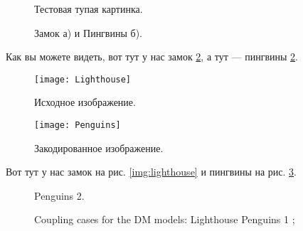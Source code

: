 \documentclass[a4paper,12pt]{report} %
\begin{document}
    \begin{spacing}{0.9}
        \tableofcontents %
    \end{spacing}
    \begin{figure}[h]
        \caption{Тестовая тупая картинка.}
        \label{img:image}
    \end{figure}
    \begin{figure}[h]
        \begin{minipage}[h]{0.49\linewidth}
        \end{minipage}
        \hfill
        \begin{minipage}[h]{0.49\linewidth}
        \end{minipage}
        \caption{Замок а) и Пингвины б).}
        \label{img:castle_penguins}
    \end{figure}
    Как вы можете видеть, вот тут у нас замок \ref{img:castle_penguins}, а тут — пингвины \ref{img:castle_penguins}.
    \begin{figure}[h]
        \begin{center}
            \begin{minipage}[h]{0.4\linewidth}
                \texttt{[image: Lighthouse]}
                \caption{Исходное изображение.} %
                \label{img:lighthouse} %
            \end{minipage}
            \hfill 
            \begin{minipage}[h]{0.4\linewidth}
                \texttt{[image: Penguins]}
                \caption{Закодированное изображение.}
                \label{img:penguins}
            \end{minipage}
        \end{center}
    \end{figure}
    Вот тут у нас замок на рис. \ref{img:lighthouse} и пингвины на рис. \ref{img:penguins}.
    \begin{figure}[ht!]
        \vspace{-4ex}
        \centering
        \hspace{4ex}
        \hspace{4ex}
        \caption{Coupling cases for the DM models: 
         Lighthouse
         Penguins 1 ; 
        } Penguins 2.
        \label{fig:threeDMcases}
    \end{figure}
\end{document}
